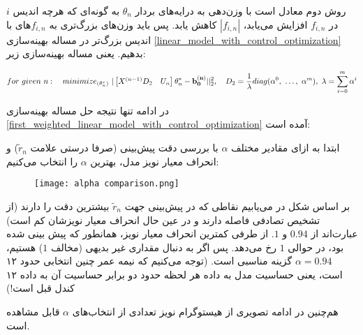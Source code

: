 \documentclass{scribe-cgenomics}
\begin{document}
روش دوم معادل است با وزن‌دهی به درایه‌های بردار
$\theta_n$
به گونه‌ای که هرچه اندیس
$i$
در
$f_{i, n}$
افزایش می‌یابد،
$|f_{i,n}|$
کاهش یابد. پس باید وزن‌های بزرگ‌تری به
$f_{i,n}$های
با اندیس بزرگ‌تر در مساله بهینه‌سازی
\ref{linear_model_with_control_optimization}
بدهیم. یعنی مساله بهینه‌سازی زیر:

\label{second_weighted_linear_model_with_control_optimization}
\begin{equation}
for\ given\ n:\quad minimize_{(\theta^*_n)}\ |
\begin{bmatrix}
X^{(n-1)}D_2 & U_n
\end{bmatrix}
\theta^*_n - \bold{b^{(n)}_0}||_2^2,
\quad
D_2 = \dfrac{1}{\lambda}diag(\alpha^0,\ \dots, \ \alpha^{m}),\ \lambda= \sum_{i=0}^{m} \alpha^i
\end{equation}

در ادامه تنها نتیجه حل مساله بهینه‌سازی
\ref{first_weighted_linear_model_with_control_optimization}
آمده‌ است:

\begin{مشاهده}
ابتدا به ازای مقادیر مختلف
$\alpha$
با بررسی دقت پیش‌بینی (صرفا درستی علامت
$\tilde{r}_n$)
و انحراف معیار نویز مدل، بهترین
$\alpha$
را انتخاب می‌کنیم:

\begin{figure}
\texttt{[image: alpha comparison.png]}
\centering
\end{figure}

بر اساس شکل در می‌یابیم نقاطی که در پیش‌بینی جهت
$\tilde{r}_n$
بیشترین دقت را دارند (از تشخیص تصادفی فاصله دارند و در عین حال انحراف معیار نویزشان کم است) عبارت‌اند از
$0.94$
و
$1$.
از طرفی کمترین انحراف معیار نویز، همانطور که پیش بینی شده بود، در حوالی 
$1$
رخ می‌دهد. پس اگر به دنبال مقداری غیر بدیهی (مخالف
$1$)
هستیم،
$\alpha=0.94$
گزینه مناسبی است. (توجه می‌کنیم که نیمه عمر چنین انتخابی حدود ۱۲ است، یعنی حساسیت مدل به داده هر لحظه حدود دو برابر حساسیت آن به داده ۱۲ کندل قبل است!)

هم‌چنین در ادامه تصویری از هیستوگرام نویز تعدادی از انتخاب‌های
$\alpha$
قابل مشاهده است.

\begin{figure}
 \\
\label{alpha_values}
\centering
\end{figure}
\end{مشاهده}
\end{document}
